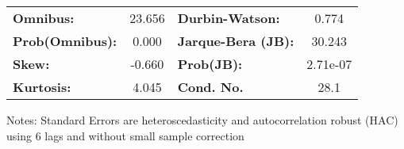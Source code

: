 \begin{center}
\begin{tabular}{lcccccc}
\bottomrule
\end{tabular}
\begin{tabular}{lclc}
\textbf{Omnibus:}       & 23.656 & \textbf{  Durbin-Watson:     } &    0.774  \\
\textbf{Prob(Omnibus):} &  0.000 & \textbf{  Jarque-Bera (JB):  } &   30.243  \\
\textbf{Skew:}          & -0.660 & \textbf{  Prob(JB):          } & 2.71e-07  \\
\textbf{Kurtosis:}      &  4.045 & \textbf{  Cond. No.          } &     28.1  \\
\bottomrule
\end{tabular}
\end{center}

Notes: \newline
 [1] Standard Errors are heteroscedasticity and autocorrelation robust (HAC) using 6 lags and without small sample correction
